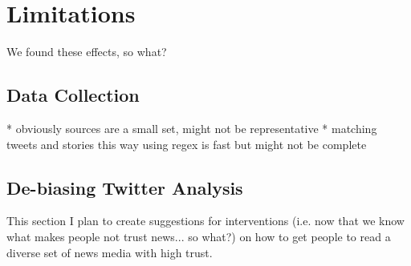 \chapter{Limitations}
We found these effects, so what?
 
\section{Data Collection}
* obviously sources are a small set, might not be representative
* matching tweets and stories this way using regex is fast but might not be complete


\section{De-biasing Twitter Analysis}
This section I plan to create suggestions for interventions (i.e. now that we know what makes people not trust news... so what?) on how to get people to read a diverse set of news media with high trust.